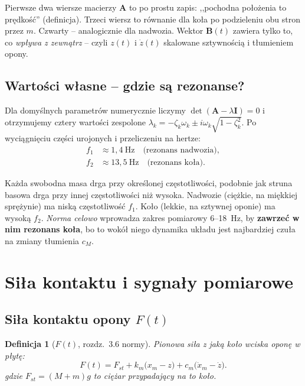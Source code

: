 \documentclass[11pt,a4paper]{article}
\renewcommand{\vec}[1]{\mathbf{#1}}
\theoremstyle{plainpol}
\newtheorem{definicja}{Definicja}[section]
\begin{document}
\begin{intuicja}
Pierwsze dwa wiersze macierzy $\vec{A}$ to po prostu zapis: ,,pochodna
położenia to prędkość'' (definicja). Trzeci wiersz to równanie dla koła
po podzieleniu obu stron przez $m$. Czwarty -- analogicznie dla nadwozia.
Wektor $\vec{B}(t)$ zawiera tylko to, co \emph{wpływa z zewnątrz} -- czyli
$z(t)$ i $\dot{z}(t)$ skalowane sztywnością i tłumieniem opony.
\end{intuicja}

\subsection{Wartości własne -- gdzie są rezonanse?}

Dla domyślnych parametrów numerycznie liczymy
$\det(\vec{A} - \lambda \vec{I}) = 0$ i otrzymujemy cztery wartości
zespolone $\lambda_k = -\zeta_k\omega_k \pm i\omega_k\sqrt{1-\zeta_k^2}$.
Po wyciągnięciu części urojonych i przeliczeniu na hertze:
\begin{align}
  f_1 &\approx 1{,}4~\mathrm{Hz} \quad \text{(rezonans nadwozia)},\\
  f_2 &\approx 13{,}5~\mathrm{Hz} \quad \text{(rezonans koła)}.
\end{align}

\begin{intuicja}
Każda swobodna masa drga przy określonej częstotliwości, podobnie jak
struna basowa drga przy innej częstotliwości niż wysoka. Nadwozie
(ciężkie, na miękkiej sprężynie) ma niską częstotliwość $f_1$. Koło
(lekkie, na sztywnej oponie) ma wysoką $f_2$. \emph{Norma celowo}
wprowadza zakres pomiarowy 6--18~Hz, by \textbf{zawrzeć w nim rezonans
koła}, bo to wokół niego dynamika układu jest najbardziej czuła na
zmiany tłumienia $c_M$.
\end{intuicja}

\section{Siła kontaktu i sygnały pomiarowe}

\subsection{Siła kontaktu opony $F(t)$}

\begin{definicja}[$F(t)$, rozdz.~3.6 normy]
Pionowa siła z jaką koło wciska oponę w płytę:
\begin{equation}
  F(t) = F_{st} + k_m\bigl(x_m - z\bigr) + c_m\bigl(\dot{x}_m - \dot{z}\bigr).
  \label{eq:F}
\end{equation}
gdzie $F_{st} = (M+m)g$ to ciężar przypadający na to koło.
\end{definicja}
\end{document}
